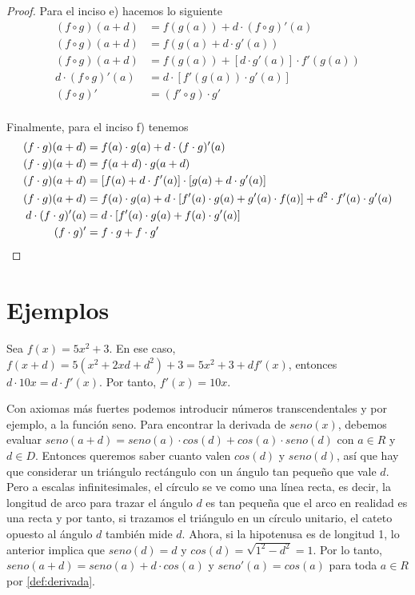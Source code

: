 \begin{proof}
  Para el inciso e) hacemos lo siguiente
  \begin{align*}
     (f\circ g)(a+d) &= f(g(a))+d\cdot (f\circ g)'(a)\\
      (f\circ g)(a+d) &= f(g(a)+d\cdot g'(a))\\
      (f\circ g)(a+d) &= f(g(a))+[d\cdot g'(a)] \cdot f'(g(a))\\
      d\cdot (f\circ g)'(a) &= d\cdot [f'(g(a))\cdot g'(a)]\\
      (f\circ g)'&=(f'\circ g)\cdot g'\\
  \end{align*}

  Finalmente, para el inciso f) tenemos
  \begin{align*}
     (f\cdot g)(a+d) &= f(a)\cdot g(a)+d\cdot (f\cdot g)'(a)\\
      (f\cdot g)(a+d) &= f(a+d)\cdot g(a+d)\\
      (f\cdot g)(a+d) &= [f(a)+d\cdot f'(a)]\cdot [g(a)+d\cdot g'(a)]\\
      (f\cdot g)(a+d) &= f(a)\cdot g(a)+d\cdot[f'(a)\cdot g(a)+g'(a)\cdot f(a)]+d^2\cdot f'(a)\cdot g'(a)\\
      d\cdot (f\cdot g)'(a)&=d\cdot[f'(a)\cdot g(a)+f(a)\cdot g'(a)]\\
      (f\cdot g)'&=f\cdot g+f\cdot g' \qedhere
  \end{align*}
\end{proof}

\section{Ejemplos}
Sea $f(x) = 5x^2+3$. En ese caso, $f(x+d)=5(x^2+2xd+d^2)+3=5x^2+3+df'(x)$, entonces $d\cdot 10x=d\cdot f'(x)$.
Por tanto, $f'(x)=10x$.

Con axiomas más fuertes podemos introducir números transcendentales y por ejemplo, a la función seno. Para encontrar
la derivada de $seno(x)$, debemos evaluar $seno(a+d)=seno(a)\cdot cos(d)+cos(a)\cdot seno(d)$ con $a\in R$ y $d\in D$. Entonces queremos
saber cuanto valen $cos(d)$ y $seno(d)$, así que hay que considerar un triángulo rectángulo con un ángulo tan pequeño
que vale $d$. Pero a escalas infinitesimales, el círculo se ve como una línea recta, es decir, la longitud de arco para
trazar el ángulo $d$ es tan pequeña que el arco en realidad es una recta y por tanto, si trazamos el triángulo en un círculo unitario, el cateto opuesto al ángulo $d$ también mide $d$.
Ahora, si la hipotenusa es de longitud 1, lo anterior implica que $seno(d)=d$ y $cos(d)=\sqrt{1^2-d^2}=1$. Por lo tanto, $seno(a+d)=seno(a)+d\cdot cos(a)$ y $seno'(a)=cos(a)$
para toda $a\in R$ por \ref{def:derivada}.

